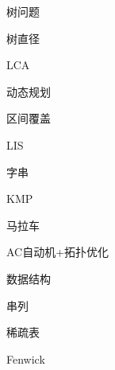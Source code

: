 \documentclass{article}
\begin{document}
\begin{enumerate}
{\bf \LARGE \item 树问题}
	
	\begin{itemize}
	
	{\bf \item 树直径}
	

	{\bf \item LCA}
	
	
	
	\end{itemize}

{\bf \LARGE \item  动态规划}

	\begin{itemize}
	
	{\bf \item 区间覆盖}
		
	
	{\bf \item  LIS}
		
	
	
	\end{itemize}

{\bf \LARGE \item  字串}

	\begin{itemize}
	
	{\bf \item KMP}
		
	
	{\bf \item 马拉车}
		
	
	{\bf \item AC自动机+拓扑优化}
	
		
	
	\end{itemize}
	

{\bf \LARGE \item  数据结构}

	\begin{itemize}
	
	{\bf \item 串列}
		
	
	{\bf \item 稀疏表}
				
	
	{\bf \item Fenwick}
	
	
	\end{itemize}



\end{enumerate}
\end{document}
